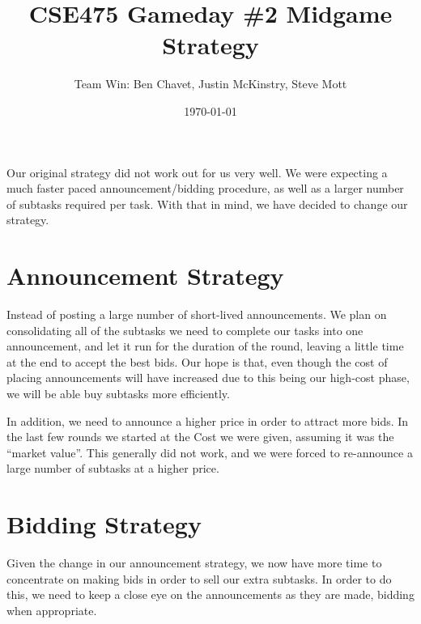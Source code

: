 \documentclass{article}
\title{CSE475 Gameday \#2 Midgame Strategy}
\author{Team Win: Ben Chavet, Justin McKinstry, Steve Mott}
\date{\today}
\begin{document}
\maketitle

Our original strategy did not work out for us very well.  We were expecting
a much faster paced announcement/bidding procedure, as well as a larger
number of subtasks required per task.  With that in mind, we have decided
to change our strategy.

\section{Announcement Strategy}

Instead of posting a large number of short-lived announcements.  We plan on
consolidating all of the subtasks we need to complete our tasks into one
announcement, and let it run for the duration of the round, leaving a little
time at the end to accept the best bids.  Our hope is that, even though the
cost of placing announcements will have increased due to this being our
high-cost phase, we will be able buy subtasks more efficiently.

In addition, we need to announce a higher price in order to attract more bids.
In the last few rounds we started at the Cost we were given, assuming it was
the ``market value''.  This generally did not work, and we were forced to
re-announce a large number of subtasks at a higher price.

\section{Bidding Strategy}

Given the change in our announcement strategy, we now have more time to
concentrate on making bids in order to sell our extra subtasks.  In order
to do this, we need to keep a close eye on the announcements as they are
made, bidding when appropriate.
\end{document}
